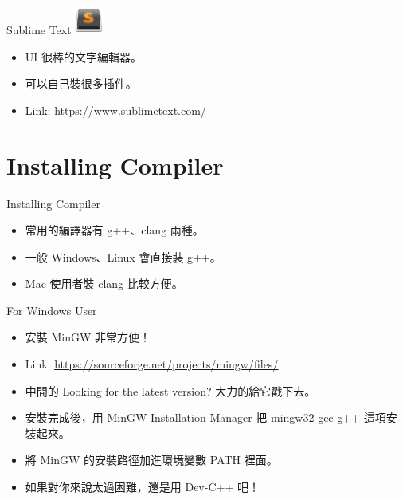 \documentclass[t]{beamer}
\begin{document}
\begin{frame}{Sublime Text}
  \vspace{0.5em}
  \hspace{2em}
  \includegraphics[height=2.5em]{st.png}
  \vspace{0.5em}
  \begin{itemize}
    \item UI 很棒的文字編輯器。
    \item 可以自己裝很多插件。
    \item Link: \href{https://www.sublimetext.com/}{\underline{https://www.sublimetext.com/}}
  \end{itemize}
\end{frame}

\section{Installing Compiler}
\begin{frame}{Installing Compiler}
  \begin{itemize}
    \item 常用的編譯器有 g++、clang 兩種。
    \item 一般 Windows、Linux 會直接裝 g++。
    \item Mac 使用者裝 clang 比較方便。
  \end{itemize}
\end{frame}

\begin{frame}{For Windows User}
  \begin{itemize}
    \item 安裝 MinGW 非常方便！
    \item Link: \href{https://sourceforge.net/projects/mingw/files/}{\underline{https://sourceforge.net/projects/mingw/files/}}
    \item 中間的 Looking for the latest version? 大力的給它戳下去。
    \item 安裝完成後，用 MinGW Installation Manager 把 mingw32-gcc-g++ 這項安裝起來。
    \item 將 MinGW 的安裝路徑加進環境變數 PATH 裡面。
    \item 如果對你來說太過困難，還是用 Dev-C++ 吧！
  \end{itemize}
\end{frame}
\end{document}
